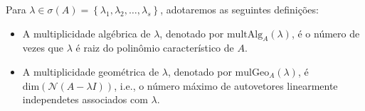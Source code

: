 % 
% 
% 
% 
% 
% 
%
%
Para $\lambda \in \sigma(A) = \left\{ \lambda_1, \lambda_2, \ldots, \lambda_s \right\}$, adotaremos as seguintes defini\c{c}\~{o}es:
\begin{itemize}
    \item A multiplicidade alg\'{e}brica de $\lambda$, denotado por $\mathrm{multAlg}_A(\lambda)$, \'{e} o n\'{u}mero de vezes que $\lambda$ \'{e} raiz do polin\^{o}mio caracter\'{i}stico de $A$.
    \item A multiplicidade geom\'{e}trica de $\lambda$, denotado por $\mathrm{mulGeo}_A(\lambda)$, \'{e} $\mathrm{dim}(\mathcal{N}(A - \lambda I))$, i.e., o n\'{u}mero m\'{a}ximo de autovetores linearmente independetes associados com $\lambda$.
\end{itemize}
